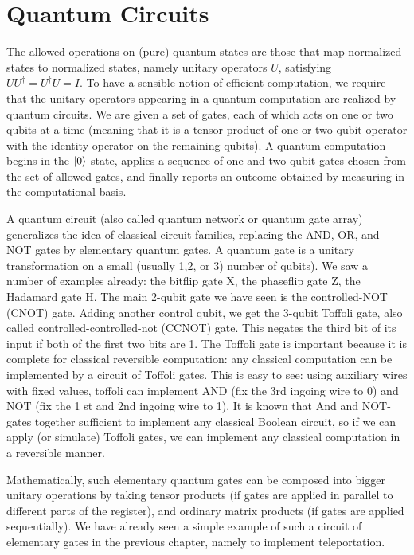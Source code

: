 \chapter{Quantum Circuits}

The allowed operations on (pure) quantum states are those that map normalized states to normalized states, namely unitary operators $U$, satisfying $UU^{\dagger}=U^{\dagger}U=I$. To have a sensible notion of efficient computation, we require that the unitary operators appearing in a quantum computation are realized by quantum circuits. We are given a set of gates, each of which acts on one or two qubits at a time (meaning that it is a tensor product of one or two qubit operator with the identity operator on the remaining qubits). A quantum computation begins in the $\ket{0}$ state, applies a sequence of one and two qubit gates chosen from the set of allowed gates, and finally reports an outcome obtained by measuring in the computational basis.

A quantum circuit (also called quantum network or quantum gate array) generalizes the idea of classical circuit families, replacing the AND, OR, and NOT gates by elementary quantum gates. A quantum gate is a unitary transformation on a small (usually 1,2, or 3) number of qubits). We saw a number of examples already: the bitflip gate X, the phaseflip gate Z, the Hadamard gate H. The main 2-qubit gate we have seen is the controlled-NOT (CNOT) gate. Adding another control qubit, we get the 3-qubit Toffoli gate, also called controlled-controlled-not (CCNOT) gate. This negates the third bit of its input if both of the first two bits are 1. The Toffoli gate is important because it is complete for classical reversible computation: any classical computation can be implemented by a circuit of Toffoli gates. This is easy to see: using auxiliary wires with fixed values, toffoli can implement AND (fix the 3rd ingoing wire to 0) and NOT (fix the 1 st and 2nd ingoing wire to 1). It is known that And and NOT-gates together sufficient to implement any classical Boolean circuit, so if we can apply (or simulate) Toffoli gates, we can implement any classical computation in a reversible manner.

Mathematically, such elementary quantum gates can be composed into bigger unitary operations by taking tensor products (if gates are applied in parallel to different parts of the register), and ordinary matrix products (if gates are applied sequentially). We have already seen a simple example of such a circuit of elementary gates in the previous chapter, namely to implement teleportation.

